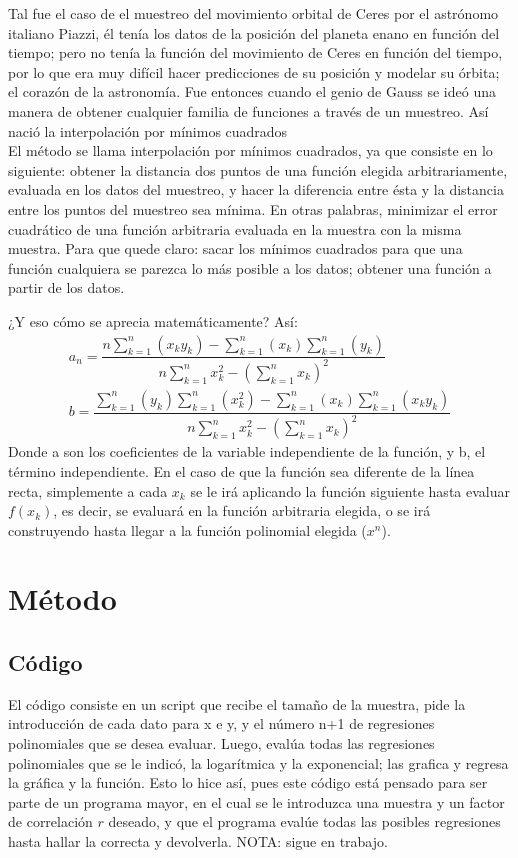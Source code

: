 \documentclass[12pt,oneside,FLEQN]{report}
\begin{document}
{Tal fue el caso de el muestreo del movimiento orbital de Ceres por el astrónomo italiano Piazzi, él tenía los datos de la posición del planeta enano en función del tiempo; pero no tenía la función del movimiento de Ceres en función del tiempo, por lo que era muy difícil hacer predicciones de su posición y modelar su órbita; el corazón de la astronomía. Fue entonces cuando el genio de Gauss se ideó una manera de obtener cualquier familia de funciones a través de un muestreo. Así nació la interpolación por mínimos cuadrados\\

El método se llama interpolación por mínimos cuadrados, ya que consiste en lo siguiente: obtener la distancia dos puntos de una función elegida arbitrariamente, evaluada en los datos del muestreo, y hacer la diferencia entre ésta y la distancia entre los puntos del muestreo sea mínima. En otras palabras, minimizar el error cuadrático de una función arbitraria evaluada en la muestra con la misma muestra. Para que quede claro: sacar los mínimos cuadrados para que una función cualquiera se parezca lo más posible a los datos; obtener una función a partir de los datos.

¿Y eso cómo se aprecia matemáticamente? Así:
\begin{align}
	a_{n}=\dfrac{n\sum_{k=1}^{n}(x_{k}y_{k})-\sum_{k=1}^{n}(x_{k})\sum_{k=1}^{n}(y_{k})}{n\sum_{k=1}^{n}x^{2}_{k}-(\sum_{k=1}^{n}x_{k})^{2}}\\
	b=\dfrac{\sum_{k=1}^{n}(y_{k})\sum_{k=1}^{n}(x^{2}_{k})-\sum_{k=1}^{n}(x_{k})\sum_{k=1}^{n}(x_{k}y_{k})}{n\sum_{k=1}^{n}x^{2}_{k}-(\sum_{k=1}^{n}x_{k})^{2}}
\end{align}
Donde a son los coeficientes de la variable independiente de la función, y b, el término independiente. En el caso de que la función sea diferente de la línea recta, simplemente a cada $x_{k}$ se le irá aplicando la función siguiente hasta evaluar $f(x_{k})$, es decir, se evaluará en la función arbitraria elegida, o se irá construyendo hasta llegar a la función polinomial elegida ($x^{n}$).
\chapter{Método}
	\section{Código}
		El código consiste en un script que recibe el tamaño de la muestra, pide la introducción de cada dato para x e y, y el número n+1 de regresiones polinomiales que se desea evaluar. Luego, evalúa todas las regresiones polinomiales que se le indicó, la logarítmica y la exponencial; las grafica y regresa la gráfica y la función. Esto lo hice así, pues este código está pensado para ser parte de un programa mayor, en el cual se le introduzca una muestra y un factor de correlación $r$ deseado, y que el programa evalúe todas las posibles regresiones hasta hallar la correcta y devolverla. NOTA: sigue en trabajo.
}
\end{document}
